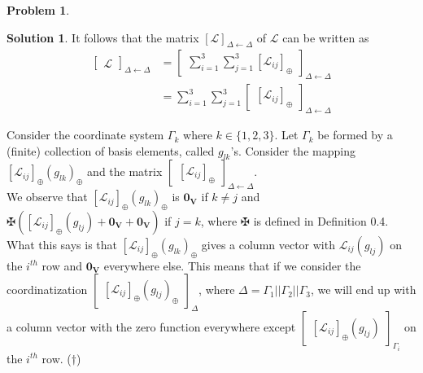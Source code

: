 \documentclass{book}
\theoremstyle{definition}
\newtheorem*{prob*}{Problem}
\newtheorem*{sln*}{Solution}
\newcommand{\V}{\mathbf{V}}
\newcommand{\lag}{\mathcal{L}}
\begin{document}
\begin{prob*}
\begin{sln*}
	It follows that the matrix $[\lag]_{\Delta\leftarrow\Delta}$ of $\lag$ can be written as
	\begin{align*}
	\begin{bmatrix}
	\lag
	\end{bmatrix}_{\Delta\leftarrow\Delta}
	&=
	\begin{bmatrix}
	\sum^3_{i=1}\sum^3_{j=1}[\lag_{ij}]_\oplus
	\end{bmatrix}_{\Delta\leftarrow\Delta}\\
	&=
	\sum^3_{i=1}\sum^3_{j=1}\begin{bmatrix}
	[\lag_{ij}]_\oplus
	\end{bmatrix}_{\Delta\leftarrow\Delta}
	\end{align*}
	
	Consider the coordinate system $\Gamma_k$ where $k\in \{1,2,3\}$. Let $\Gamma_k$ be formed by a (finite) collection of basis elements, called $g_{lk}$'s. Consider the mapping $[\lag_{ij}]_\oplus(g_{lk})_\oplus$ and the matrix $\begin{bmatrix}[\lag_{ij}]_\oplus\end{bmatrix}_{\Delta\leftarrow\Delta}$. \\
	
	We observe that $[\lag_{ij}]_\oplus(g_{lk})_\oplus$ is $\mathbf{0}_\V$ if $k\neq j$ and $\maltese\left([\lag_{ij}]_\oplus(g_{lj}) + \mathbf{0}_\V + \mathbf{0}_\V \right)$ if $j=k$, where $\maltese$ is defined in Definition 0.4. What this says is that $[\lag_{ij}]_\oplus(g_{lk})_\oplus$ gives a column vector with $\lag_{ij}(g_{lj})$ on the $i^{th}$ row and $\mathbf{0}_\V$ everywhere else. This means that if we consider the coordinatization $\begin{bmatrix}
	[\lag_{ij}]_\oplus(g_{lj})_\oplus
	\end{bmatrix}_\Delta$, where $\Delta = \Gamma_1||\Gamma_2||\Gamma_3$, we will end up with a column vector with the zero function everywhere except $\begin{bmatrix}[\lag_{ij}]_\oplus(g_{lj})\end{bmatrix}_{\Gamma_i}$ on the $i^{th}$ row. ($\dagger$) \\
	

\end{sln*}
\end{prob*}
\end{document}
